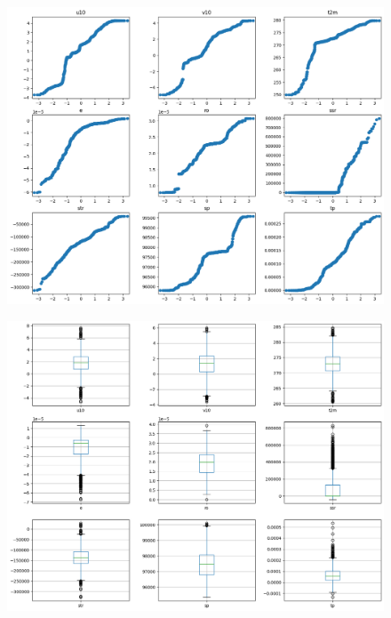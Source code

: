 \begin{figure}[H]
    \centering
    \includegraphics[width=\textwidth]{images/dt_qq.png}
    \caption{}
    \label{dt-qq}
\end{figure}

\begin{figure}[H]
    \centering
    \includegraphics[width=\textwidth]{images/svr_box.png}
    \caption{}
    \label{svr-box}
\end{figure}


